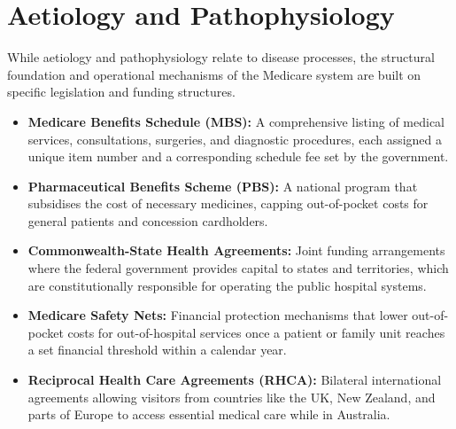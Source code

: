 \section*{Aetiology and Pathophysiology}
While aetiology and pathophysiology relate to disease processes, the structural foundation and operational mechanisms of the Medicare system are built on specific legislation and funding structures.
\begin{itemize}
    \item \textbf{Medicare Benefits Schedule (MBS):} A comprehensive listing of medical services, consultations, surgeries, and diagnostic procedures, each assigned a unique item number and a corresponding schedule fee set by the government.
    \item \textbf{Pharmaceutical Benefits Scheme (PBS):} A national program that subsidises the cost of necessary medicines, capping out-of-pocket costs for general patients and concession cardholders.
    \item \textbf{Commonwealth-State Health Agreements:} Joint funding arrangements where the federal government provides capital to states and territories, which are constitutionally responsible for operating the public hospital systems.
    \item \textbf{Medicare Safety Nets:} Financial protection mechanisms that lower out-of-pocket costs for out-of-hospital services once a patient or family unit reaches a set financial threshold within a calendar year.
    \item \textbf{Reciprocal Health Care Agreements (RHCA):} Bilateral international agreements allowing visitors from countries like the UK, New Zealand, and parts of Europe to access essential medical care while in Australia.
\end{itemize}

